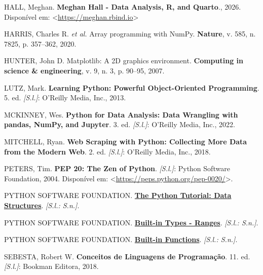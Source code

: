 \documentclass[
  brazilian,
  letterpaper,
  DIV=11,
  numbers=noendperiod]{scrreprt}
\newlength{\cslhangindent}
\newenvironment{CSLReferences}[2] %
 {\begin{list}{}{%
  \setlength{\itemindent}{0pt}
  \setlength{\leftmargin}{0pt}
  \setlength{\parsep}{0pt}
  \ifodd #1
   \setlength{\leftmargin}{\cslhangindent}
   \setlength{\itemindent}{-1\cslhangindent}
  \fi
  \setlength{\itemsep}{#2\baselineskip}}}
 {\end{list}}
\begin{document}
\label{refs}
\begin{CSLReferences}{0}{1}
HALL, Meghan. \textbf{Meghan Hall - Data Analysis, R, and Quarto}.,
2026. Disponível em:
\textless{}\url{https://meghan.rbind.io}\textgreater{}

HARRIS, Charles R. \emph{et al.} Array programming with NumPy.
\textbf{Nature}, v. 585, n. 7825, p. 357--362, 2020.

HUNTER, John D. Matplotlib: A 2D graphics environment. \textbf{Computing
in science \& engineering}, v. 9, n. 3, p. 90--95, 2007.

LUTZ, Mark. \textbf{Learning Python: Powerful Object-Oriented
Programming}. 5. ed. \emph{{[}S.l.{]}}: O'Reilly Media, Inc., 2013.

MCKINNEY, Wes. \textbf{Python for Data Analysis: Data Wrangling with
pandas, NumPy, and Jupyter}. 3. ed. \emph{{[}S.l.{]}}: O'Reilly Media,
Inc., 2022.

MITCHELL, Ryan. \textbf{Web Scraping with Python: Collecting More Data
from the Modern Web}. 2. ed. \emph{{[}S.l.{]}}: O'Reilly Media, Inc.,
2018.

PETERS, Tim. \textbf{PEP 20: The Zen of Python}. \emph{{[}S.l.{]}}:
Python Software Foundation, 2004. Disponível em:
\textless{}\url{https://peps.python.org/pep-0020/}\textgreater.

PYTHON SOFTWARE FOUNDATION.
\textbf{\href{https://docs.python.org/3/tutorial/datastructures.html}{The
Python Tutorial: Data Structures}}. \emph{{[}S.l.: S.n.{]}}.

PYTHON SOFTWARE FOUNDATION.
\textbf{\href{https://docs.python.org/3/library/stdtypes.html\#ranges}{Built-in
Types - Ranges}}. \emph{{[}S.l.: S.n.{]}}.

PYTHON SOFTWARE FOUNDATION.
\textbf{\href{https://docs.python.org/3/library/functions.html}{Built-in
Functions}}. \emph{{[}S.l.: S.n.{]}}.

SEBESTA, Robert W. \textbf{Conceitos de Linguagens de Programação}. 11.
ed. \emph{{[}S.l.{]}}: Bookman Editora, 2018.


\end{CSLReferences}
\end{document}
